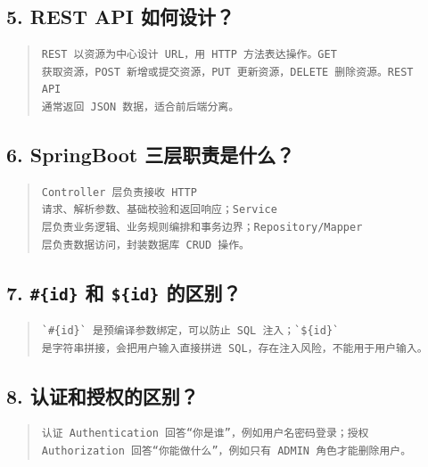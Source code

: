 \documentclass[UTF8,zihao=-4]{ctexart}
\begin{document}
\subsection{5. REST API 如何设计？}

\begin{quote}
\footnotesize
\begin{verbatim}
REST 以资源为中心设计 URL，用 HTTP 方法表达操作。GET 
获取资源，POST 新增或提交资源，PUT 更新资源，DELETE 删除资源。REST 
API 
通常返回 JSON 数据，适合前后端分离。
\end{verbatim}
\end{quote}

\subsection{6. SpringBoot 三层职责是什么？}

\begin{quote}
\footnotesize
\begin{verbatim}
Controller 层负责接收 HTTP 
请求、解析参数、基础校验和返回响应；Service 
层负责业务逻辑、业务规则编排和事务边界；Repository/Mapper 
层负责数据访问，封装数据库 CRUD 操作。
\end{verbatim}
\end{quote}

\subsection{7. \texttt{\#\{id\}} 和 \texttt{\$\{id\}} 的区别？}

\begin{quote}
\footnotesize
\begin{verbatim}
`#{id}` 是预编译参数绑定，可以防止 SQL 注入；`${id}` 
是字符串拼接，会把用户输入直接拼进 SQL，存在注入风险，不能用于用户输入。
\end{verbatim}
\end{quote}

\subsection{8. 认证和授权的区别？}

\begin{quote}
\footnotesize
\begin{verbatim}
认证 Authentication 回答“你是谁”，例如用户名密码登录；授权 
Authorization 回答“你能做什么”，例如只有 ADMIN 角色才能删除用户。
\end{verbatim}
\end{quote}
\end{document}
